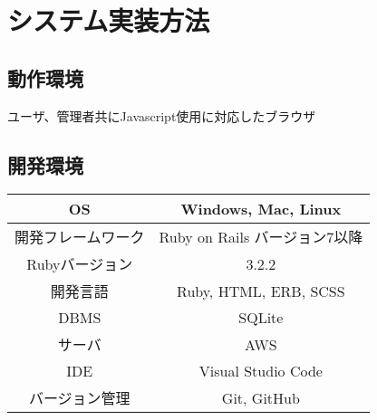 \chapter{システム実装方法}
\section*{動作環境}
ユーザ、管理者共にJavascript使用に対応したブラウザ
\section*{開発環境}
\begin{tabular}{|c|c|} \hline
   OS & Windows, Mac, Linux\\  \hline
   開発フレームワーク & Ruby on Rails  バージョン7以降 \\ \hline
   Rubyバージョン & 3.2.2\\  \hline
   開発言語 & Ruby, HTML, ERB, SCSS\\ \hline
   DBMS & SQLite \\ \hline
   サーバ & AWS \\ \hline
   IDE & Visual Studio Code \\ \hline
   バージョン管理 & Git, GitHub \\ \hline
 \end{tabular}
